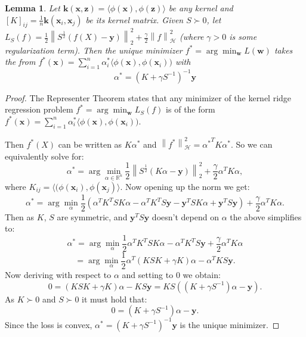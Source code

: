 \documentclass[10pt]{article} %
\theoremstyle{plain}
\newtheorem{lemma}[theorem]{Lemma}
\theoremstyle{definition}
\theoremstyle{remark}
\newcommand{\norm}[1]{\left\lVert#1\right\rVert}
\newcommand{\x}{\mathbf{x}}
\newcommand{\z}{\mathbf{z}}
\newcommand{\y}{\mathbf{y}}
\newcommand{\w}{\mathbf{w}}
\newcommand{\kr}{\boldsymbol{k}}
\begin{document}
\begin{lemma}\label{lem:krr_s}
    Let $\kr(\x,\z) = \langle \phi(\x), \phi(\z) \rangle$ be any kernel and $[K]_{ij}=\frac{1}{n}\kr(\x_i,\x_j)$ be its kernel matrix. Given $S\succ 0$, let  $L_S(f)=\frac{1}{2}\norm{S^\frac{1}{2}(f(X)-\y)}_2^2 + \frac{\gamma}{2}\norm{f}_\mathcal{H}^2$ (where $\gamma > 0$ is some regularization term).
    Then the unique minimizer $f^* = \arg\min_\w L(\w)$ takes the from $f^*(\x)=\sum_{i=1}^n\alpha^*_i\langle \phi(\x), \phi(\x_i))$ with
    \[
    \alpha^*=\left(K + \gamma S^{-1}\right)^{-1}\y
    \]
\end{lemma}
\begin{proof}
The Representer Theorem \citep{scholkopf2001generalized} states that any minimizer of the kernel ridge regression problem $f^* = \arg\min_\w L_S(f)$ is of the form $f^*(\x)=\sum_{i=1}^n\alpha^*_i\langle \phi(\x), \phi(\x_i))$.

Then $f^*(X)$ can be written as $K\alpha^*$ and $\norm{f^*}_\mathcal{H}^2={\alpha^*}^TK\alpha^*$. So we can equivalently solve for:
\[
\alpha^* = \arg\min_{\alpha\in\mathbb{R}^n} \frac{1}{2}\norm{S^\frac{1}{2}(K\alpha-\y)}_2^2+ \frac{\gamma}{2}\alpha^TK\alpha,
\]
where $K_{ij} = \langle(\phi(\x_i),\phi(\x_j)\rangle$. Now opening up the norm we get:
\[
\alpha^* = \arg\min_\alpha \frac{1}{2}\left(\alpha^TK^TSK\alpha -\alpha^TK^TS\y - \y^TSK\alpha + \y^TS\y\right) + \frac{\gamma}{2}\alpha^TK\alpha.
\]
Then as $K$, $S$ are symmetric, and $\y^TS\y$ doesn't depend on $\alpha$ the above simplifies to:
\[
\alpha^* = \arg\min_\alpha \frac{1}{2}\alpha^TK^TSK\alpha - \alpha^TK^TS\y + \frac{\gamma}{2}\alpha^TK\alpha
\]
\[
= \arg\min_\alpha \frac{1}{2}\alpha^T \left(KSK + \gamma K \right)\alpha - \alpha^TKS\y.
\]
Now deriving with respect to $\alpha$ and setting to $0$ we obtain:
\[
0=\left(KSK + \gamma K \right)\alpha - KS\y = KS\left(\left(K + \gamma S^{-1}\right)\alpha - \y\right).
\]
As $K\succ 0$ and $S\succ 0$ it must hold that:
\[
0=\left(K + \gamma S^{-1}\right)\alpha - \y.
\]
Since the loss is convex, $\alpha^*=\left(K + \gamma S^{-1}\right)^{-1}\y$ is the unique minimizer. 
\end{proof}
\end{document}
